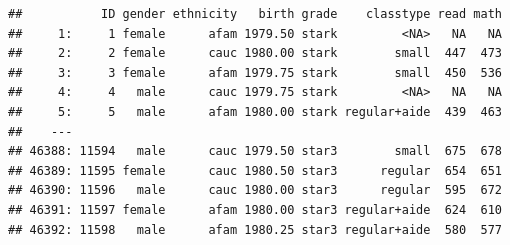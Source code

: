 \documentclass[]{book}
\newenvironment{Shaded}{\begin{snugshade}}{\end{snugshade}}
\newcommand{\KeywordTok}[1]{\textcolor[rgb]{0.13,0.29,0.53}{\textbf{#1}}}
\newcommand{\DataTypeTok}[1]{\textcolor[rgb]{0.13,0.29,0.53}{#1}}
\newcommand{\DecValTok}[1]{\textcolor[rgb]{0.00,0.00,0.81}{#1}}
\newcommand{\StringTok}[1]{\textcolor[rgb]{0.31,0.60,0.02}{#1}}
\newcommand{\CommentTok}[1]{\textcolor[rgb]{0.56,0.35,0.01}{\textit{#1}}}
\newcommand{\OperatorTok}[1]{\textcolor[rgb]{0.81,0.36,0.00}{\textbf{#1}}}
\newcommand{\NormalTok}[1]{#1}
\begin{document}
\begin{Shaded}
\end{Shaded}

\begin{verbatim}
##           ID gender ethnicity   birth grade    classtype read math
##     1:     1 female      afam 1979.50 stark         <NA>   NA   NA
##     2:     2 female      cauc 1980.00 stark        small  447  473
##     3:     3 female      afam 1979.75 stark        small  450  536
##     4:     4   male      cauc 1979.75 stark         <NA>   NA   NA
##     5:     5   male      afam 1980.00 stark regular+aide  439  463
##    ---                                                            
## 46388: 11594   male      cauc 1979.50 star3        small  675  678
## 46389: 11595 female      cauc 1980.50 star3      regular  654  651
## 46390: 11596   male      cauc 1980.00 star3      regular  595  672
## 46391: 11597 female      afam 1980.00 star3 regular+aide  624  610
## 46392: 11598   male      afam 1980.25 star3 regular+aide  580  577
\end{verbatim}
\end{document}
